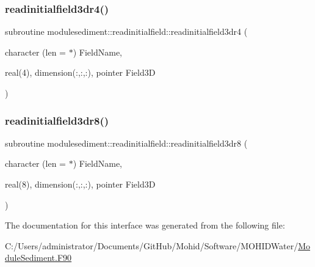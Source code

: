 \mbox{\label{interfacemodulesediment_1_1readinitialfield_a6f91524e49568ad8f52b1e44c49c7848}} 
\subsubsection{\texorpdfstring{readinitialfield3dr4()}{readinitialfield3dr4()}}
{\footnotesize\ttfamily subroutine modulesediment\+::readinitialfield\+::readinitialfield3dr4 (\begin{DoxyParamCaption}\item[{character (len = $\ast$)}]{Field\+Name,  }\item[{real(4), dimension(\+:,\+:,\+:), pointer}]{Field3D }\end{DoxyParamCaption})\hspace{0.3cm}{\ttfamily [private]}}

\mbox{\label{interfacemodulesediment_1_1readinitialfield_a05639a978fc8ba37275a4a14297f9e89}} 
\subsubsection{\texorpdfstring{readinitialfield3dr8()}{readinitialfield3dr8()}}
{\footnotesize\ttfamily subroutine modulesediment\+::readinitialfield\+::readinitialfield3dr8 (\begin{DoxyParamCaption}\item[{character (len = $\ast$)}]{Field\+Name,  }\item[{real(8), dimension(\+:,\+:,\+:), pointer}]{Field3D }\end{DoxyParamCaption})\hspace{0.3cm}{\ttfamily [private]}}



The documentation for this interface was generated from the following file\+:\begin{DoxyCompactItemize}
\item 
C\+:/\+Users/administrator/\+Documents/\+Git\+Hub/\+Mohid/\+Software/\+M\+O\+H\+I\+D\+Water/\mbox{\hyperlink{_module_sediment_8_f90}{Module\+Sediment.\+F90}}\end{DoxyCompactItemize}
